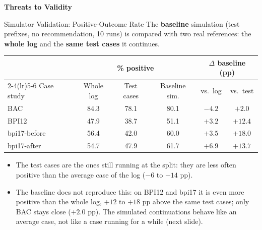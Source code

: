 \documentclass[aspectratio=169]{beamer} %
\begin{document}
\begin{frame}[plain,c]
    \centering
    \color{Darkcandyapplered}
    \Huge\textbf{Threats to Validity}
\end{frame}

\begin{frame}{Simulator Validation: Positive-Outcome Rate}
  \small
  The \textbf{baseline} simulation (test prefixes, no recommendation, 10 runs) is
  compared with two real references: the \textbf{whole log} and the \textbf{same test
  cases} it continues.
  \begin{center}
  \begin{tabular}{lccccc}
    \toprule
     & \multicolumn{3}{c}{\% positive} & \multicolumn{2}{c}{$\Delta$ baseline (pp)} \\
    \cmidrule(lr){2-4}\cmidrule(lr){5-6}
    Case study & Whole log & Test cases & Baseline sim. & vs.\ log & vs.\ test \\
    \midrule
    BAC          & 84.3 & 78.1 & 80.1 & $-4.2$ & $+2.0$  \\
    BPI12        & 47.9 & 38.7 & 51.1 & $+3.2$ & $+12.4$ \\
    bpi17-before & 56.4 & 42.0 & 60.0 & $+3.5$ & $+18.0$ \\
    bpi17-after  & 54.7 & 47.9 & 61.7 & $+6.9$ & $+13.7$ \\
    \bottomrule
  \end{tabular}
  \end{center}
  \footnotesize
  \begin{itemize}
    \item The test cases are the ones \alert{still running at the split}: they are less often positive than the
      average case of the log ($-6$ to $-14$ pp).
    \item The baseline does \alert{not} reproduce this: on BPI12 and bpi17 it is even more positive than the
      whole log, $+12$ to $+18$ pp above the same test cases; only BAC stays close ($+2.0$ pp). The simulated
      continuations behave like an average case, not like a case running for a while (next slide).
  \end{itemize}
\end{frame}
\end{document}
